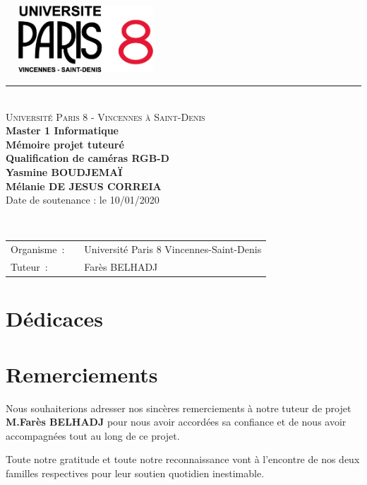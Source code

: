 \documentclass[a4paper, 12pt]{book}
\begin{document}
\begin{titlepage}
  \begin{center}
      \includegraphics[height=2.5cm, width=6cm]{images/paris8Logo.png}
    \small 
    \rule{\textwidth}{.5pt}~\\
    \large 
    \textsc{Université Paris 8 - Vincennes à Saint-Denis}\vspace{0.5cm}\\
    \textbf{Master 1 Informatique}\vspace{3.0cm}\\
    \Large
    \textbf{Mémoire projet tuteuré}\\
    \textbf{Qualification de caméras RGB-D}\vspace{1.5cm}\\
    
    \large
    \textbf{Yasmine BOUDJEMAÏ}\\
\textbf{Mélanie DE JESUS CORREIA}\vspace{1.5cm}\\
    Date de soutenance : le 10/01/2020\\
  \end{center}\vspace{3.5cm}~\\
  \begin{tabular}{ll}
    \hspace{-0.45cm}Organisme~:~&~Université Paris 8 Vincennes-Saint-Denis\\
    \hspace{-0.45cm}Tuteur~:~&~Farès  \textsc{BELHADJ}\\
  \end{tabular}
\end{titlepage}
\frontmatter



\chapter*{Dédicaces}


\chapter*{Remerciements}
\par Nous souhaiterions adresser nos sincères remerciements à notre tuteur de projet \textbf{M.Farès BELHADJ} pour nous avoir accordées sa confiance et de nous avoir accompagnées tout au long de ce projet. \\
\par Toute notre gratitude et toute notre reconnaissance vont à l'encontre de nos deux familles respectives pour leur soutien quotidien inestimable.
\end{document}

